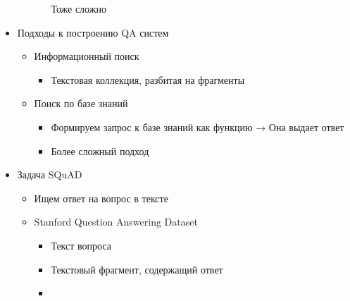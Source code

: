 \documentclass[a4paper, 12pt]{article}
\begin{document}
\begin{itemize}
\begin{itemize}
\begin{itemize}
      Тоже сложно
      
    \end{itemize}
  \end{itemize}
\item
  
  Подходы к построению QA систем
  

  \begin{itemize}
  \item
    
    {Информационный поиск}
    

    \begin{itemize}
    \item
      
      Текстовая коллекция, разбитая на фрагменты
      
    \end{itemize}
  \item
    
    {Поиск по базе знаний}
    

    \begin{itemize}
    \item
      
      Формируем запрос к базе знаний как функцию → Она выдает ответ
      
    \item
      
      Более сложный подход
      
    \end{itemize}
  \end{itemize}
\item
  
  {Задача SQuAD}
  

  \begin{itemize}
  \item
    
    Ищем ответ на вопрос в тексте
    
  \item
    
    Stanford Question Answering Dataset
    

    \begin{itemize}
    \item
      
      Текст вопроса
      
    \item
      
      Текстовый фрагмент, содержащий ответ
      
    \item
      

\end{itemize}
\end{itemize}
\end{itemize}
\end{document}
